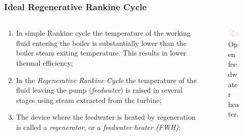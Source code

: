 \documentclass[10pt,compress,handout,ignorenonframetext]{beamer}
\begin{document}
\begin{frame}
 \frametitle{Ideal Regenerative Rankine Cycle}
  \begin{columns}
   \begin{column}[c]{0.5\linewidth}
    \begin{enumerate} %
     \item <1-> In simple Rankine cycle the temperature of the working fluid entering the boiler is substantially lower than the boiler steam exiting temperature.  This results in lower thermal efficiency;
     \item <2-> In the {\it Regenerative Rankine Cycle} the temperature of the fluid leaving the pump ({\it feedwater}) is raised in several stages using steam extracted from the turbine;
     \item <3-> The device where the feedwater is heated by regeneration is called a {\it regenerator}, or a {\it feedwater heater (FWH)};
    \end{enumerate} 
   \end{column}

   \begin{column}[c]{0.5\linewidth} 
    \begin{figure}%
     \begin{center}
      \includegraphics[width=6.25cm,clip]{./Pics/Regenerative_Rankine_Cycle_OpenFWH}
      \caption{\scriptsize Open feedwater heater.} 
     \end{center}
    \end{figure}  
   \end{column}
  \end{columns}
 \normalsize
\end{frame}
\end{document}
